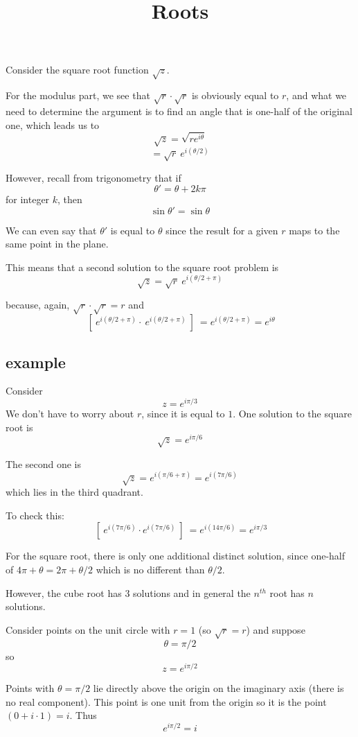\documentclass[11pt, oneside]{article}
\title{Roots}
\date{}
\begin{document}
\maketitle
\Large

Consider the square root function $\sqrt{z}$.  

For the modulus part, we see that $\sqrt{r} \cdot \sqrt{r}$ is obviously equal to $r$, and what we need to determine the argument is to find an angle that is one-half of the original one, which leads us to
\[ \sqrt{z} = \sqrt{re^{i\theta}} \]
\[ = \sqrt{r} \ e^{i (\theta/2)} \]

However, recall from trigonometry that if
\[ \theta' = \theta + 2k \pi \]
for integer $k$, then
\[ \sin \theta' = \sin \theta \]

We can even say that $\theta'$ is equal to $\theta$ since the result for a given $r$ maps to the same point in the plane.

This means that a second solution to the square root problem is
\[ \sqrt{z} = \sqrt{r} \ e^{i (\theta/2 + \pi)} \]

because, again, $\sqrt{r} \cdot \sqrt{r} = r$ and
\[ \ [ \ e^{i (\theta/2 + \pi)} \cdot \ e^{i (\theta/2 + \pi)} \ ] \  = e^{i (\theta/2 + \pi)} = e^{i\theta} \]

\subsection*{example}
Consider 
\[ z = e^{i \pi/3} \]
We don't have to worry about $r$, since it is equal to $1$.  One solution to the square root is
\[ \sqrt{z} = e^{i \pi/6} \]

The second one is
\[ \sqrt{z} = e^{i (\pi/6 + \pi)} = e^{i (7\pi/6 )} \]
which lies in the third quadrant.

To check this:
\[ \ [ \  e^{i (7\pi/6 )} \cdot  e^{i (7\pi/6 )} \ ] \ =  e^{i (14\pi/6 )} =  e^{i \pi/3 } \]

For the square root, there is only one additional distinct solution, since one-half of $4 \pi + \theta = 2 \pi + \theta/2$ which is no different than $\theta/2$.

However, the cube root has 3 solutions and in general the $n^{th}$ root has $n$ solutions.

Consider points on the unit circle with $r=1$ (so $\sqrt{r} = r$) and suppose
\[ \theta = \pi/2 \]
so
\[ z = e^{i \pi/2} \]

Points with $\theta = \pi/2$ lie directly above the origin on the imaginary axis (there is no real component).  This point is one unit from the origin so it is the point $(0 + i \cdot 1) = i$.  Thus
\[ e^{i \pi/2} = i \]
\end{document}
